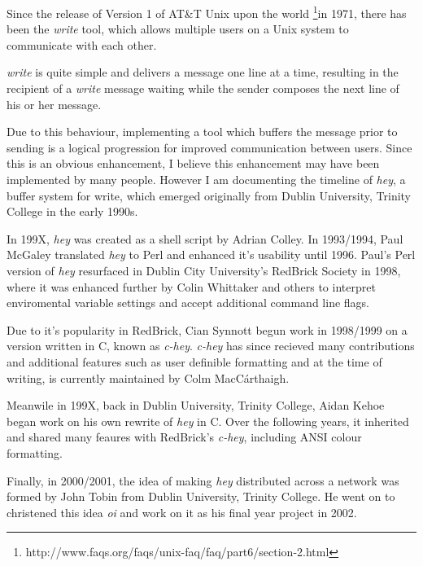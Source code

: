 Since the release of Version 1 of AT\&T Unix upon the world 
\footnote{http://www.faqs.org/faqs/unix-faq/faq/part6/section-2.html}{in 1971}, 
there has been the \emph{write} tool, which allows multiple users on a Unix 
system to communicate with each other.


\emph{write} is quite simple and delivers a message one line at a time,
resulting in the recipient of a \emph{write} message waiting while the
sender composes the next line of his or her message.


Due to this behaviour, implementing a tool which buffers the message
prior to sending is a logical progression for improved communication
between users. Since this is an obvious enhancement, I believe this
enhancement may have been implemented by many people. However I am 
documenting the timeline of \emph{hey}, a buffer system for write,
which emerged originally from Dublin University, Trinity College in the 
early 1990s.


In 199X, \emph{hey} was created as a shell script by Adrian Colley. In 
1993/1994, Paul McGaley translated \emph{hey} to Perl and enhanced it's 
usability until 1996. Paul's Perl version of \emph{hey} resurfaced in 
Dublin City University's RedBrick Society in 1998, where it was enhanced
further by Colin Whittaker and others to interpret enviromental variable 
settings and accept additional command line flags.


Due to it's popularity in RedBrick, Cian Synnott begun work in 1998/1999
on a version written in C, known as \emph{c-hey}. \emph{c-hey} has since
recieved many contributions and additional features such as user
definible formatting and at the time of writing, is currently maintained 
by Colm MacC\'{a}rthaigh.


Meanwile in 199X, back in Dublin University, Trinity College, Aidan 
Kehoe began work on his own rewrite of \emph{hey} in C. Over the 
following years, it inherited and shared many feaures with RedBrick's 
\emph{c-hey}, including ANSI colour formatting.


Finally, in 2000/2001, the idea of making \emph{hey} distributed across 
a network was formed by John Tobin from Dublin University, Trinity 
College.  He went on to christened this idea \emph{oi} and work on it 
as his final year project in 2002. 
